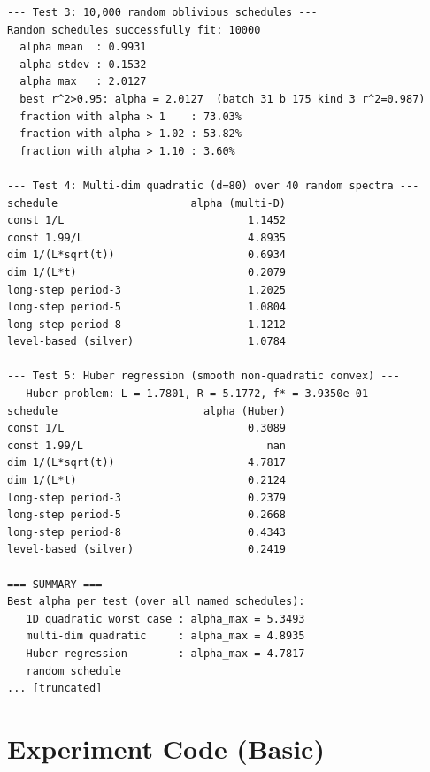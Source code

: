 \documentclass[11pt]{article}
\begin{document}
\begin{lstlisting}
--- Test 3: 10,000 random oblivious schedules ---
Random schedules successfully fit: 10000
  alpha mean  : 0.9931
  alpha stdev : 0.1532
  alpha max   : 2.0127
  best r^2>0.95: alpha = 2.0127  (batch 31 b 175 kind 3 r^2=0.987)
  fraction with alpha > 1    : 73.03%
  fraction with alpha > 1.02 : 53.82%
  fraction with alpha > 1.10 : 3.60%

--- Test 4: Multi-dim quadratic (d=80) over 40 random spectra ---
schedule                     alpha (multi-D)
const 1/L                             1.1452
const 1.99/L                          4.8935
dim 1/(L*sqrt(t))                     0.6934
dim 1/(L*t)                           0.2079
long-step period-3                    1.2025
long-step period-5                    1.0804
long-step period-8                    1.1212
level-based (silver)                  1.0784

--- Test 5: Huber regression (smooth non-quadratic convex) ---
   Huber problem: L = 1.7801, R = 5.1772, f* = 3.9350e-01
schedule                       alpha (Huber)
const 1/L                             0.3089
const 1.99/L                             nan
dim 1/(L*sqrt(t))                     4.7817
dim 1/(L*t)                           0.2124
long-step period-3                    0.2379
long-step period-5                    0.2668
long-step period-8                    0.4343
level-based (silver)                  0.2419

=== SUMMARY ===
Best alpha per test (over all named schedules):
   1D quadratic worst case : alpha_max = 5.3493
   multi-dim quadratic     : alpha_max = 4.8935
   Huber regression        : alpha_max = 4.7817
   random schedule
... [truncated]
\end{lstlisting}


\section{Experiment Code (Basic)}
\end{document}
